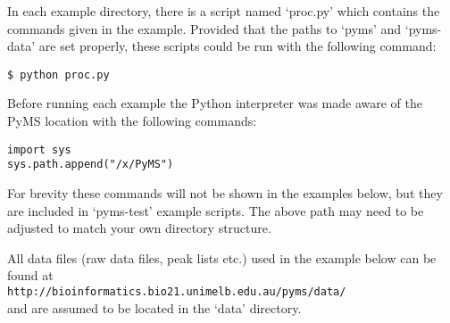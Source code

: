 In each example directory, there is a script named `proc.py' which contains
the commands given in the example.  Provided that the paths to `pyms' and
`pyms-data' are set properly, these scripts could be run with the following
command:

\begin{verbatim}
$ python proc.py
\end{verbatim}

Before running each example the Python interpreter was made aware of the
PyMS location with the following commands:

\begin{verbatim}
import sys
sys.path.append("/x/PyMS")
\end{verbatim}

For brevity these commands will not be shown in the examples below, but
they are included in `pyms-test' example scripts.  The above path may need
to be adjusted to match your own directory structure.

All data files (raw data files, peak lists etc.) used in the example below
can be found at \\
{\tt http://bioinformatics.bio21.unimelb.edu.au/pyms/data/} \\
and are assumed to be located in the `data' directory.


